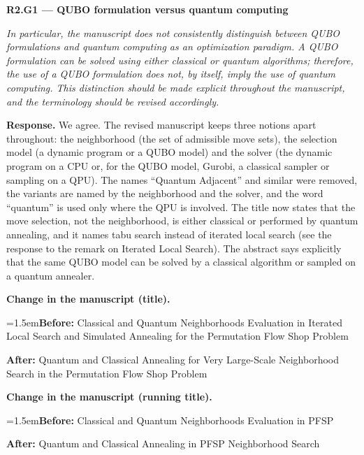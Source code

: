 \documentclass[12pt]{article}
\newenvironment{rc}[1]{\par\medskip\noindent\textbf{#1}\par\nopagebreak\noindent\itshape\renewcommand{\emph}[1]{\textbf{##1}}\ignorespaces}{\par}
\newcommand{\answer}[1]{\par\smallskip\noindent\textbf{Response.} #1\par}
\newcommand{\change}[3]{\par\smallskip\noindent\textbf{Change in the manuscript (#1).}\par
  {\leftskip=1.5em\noindent\textbf{Before:} #2\par\noindent\textbf{After:} #3\par}}
\begin{document}
\begin{rc}{R2.G1 --- QUBO formulation versus quantum computing}
In particular, the manuscript does not consistently distinguish between QUBO formulations and quantum computing as an optimization paradigm. A QUBO formulation can be solved using either classical or quantum algorithms; therefore, the use of a QUBO formulation does not, by itself, imply the use of quantum computing. This distinction should be made explicit throughout the manuscript, and the terminology should be revised accordingly.
\end{rc}
\answer{We agree. The revised manuscript keeps three notions apart throughout: the neighborhood (the set of admissible move sets), the selection model (a dynamic program or a QUBO model) and the solver (the dynamic program on a CPU or, for the QUBO model, Gurobi, a classical sampler or sampling on a QPU). The names ``Quantum Adjacent'' and similar were removed, the variants are named by the neighborhood and the solver, and the word ``quantum'' is used only where the QPU is involved. The title now states that the move selection, not the neighborhood, is either classical or performed by quantum annealing, and it names tabu search instead of iterated local search (see the response to the remark on Iterated Local Search). The abstract says explicitly that the same QUBO model can be solved by a classical algorithm or sampled on a quantum annealer.}
\change{title}{Classical and Quantum Neighborhoods Evaluation in Iterated Local Search and Simulated Annealing for the Permutation Flow Shop Problem}{Quantum and Classical Annealing for Very Large-Scale Neighborhood Search in the Permutation Flow Shop Problem}
\change{running title}{Classical and Quantum Neighborhoods Evaluation in PFSP}{Quantum and Classical Annealing in PFSP Neighborhood Search}
\end{document}
